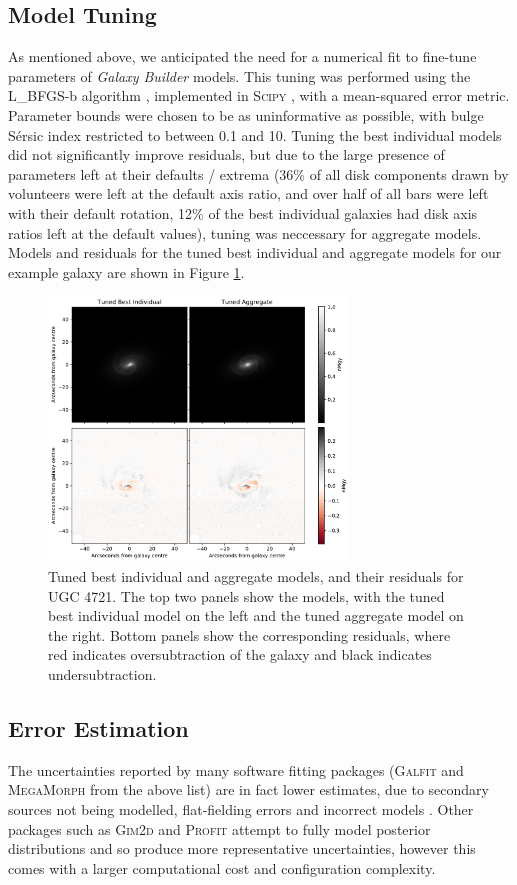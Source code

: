 \documentclass[../main.tex]{subfiles}
\begin{document}
\subsection{Model Tuning}

As mentioned above, we anticipated the need for a numerical fit to fine-tune parameters of \textit{Galaxy Builder} models. This tuning was performed using the L\_BFGS-b algorithm \citep{doi:10.1137/0916069}, implemented in \textsc{Scipy} \citep{scipy-paper}, with a mean-squared error metric. Parameter bounds were chosen to be as uninformative as possible, with bulge Sérsic index restricted to between 0.1 and 10. Tuning the best individual models did not significantly improve residuals, but due to the large presence of parameters left at their defaults / extrema (36\% of all disk components drawn by volunteers were left at the default axis ratio, and over half of all bars were left with their default rotation, 12\% of the best individual galaxies had disk axis ratios left at the default values), tuning was neccessary for aggregate models. Models and residuals for the tuned best individual and aggregate models for our example galaxy are shown in Figure \ref{fig:bi_vs_agg_comparison}.

\begin{figure}
  \includegraphics[width=8cm]{images__method/bi_vs_agg_comparison.pdf}
  \caption{Tuned best individual and aggregate models, and their residuals for UGC 4721. The top two panels show the models, with the tuned best individual model on the left and the tuned aggregate model on the right. Bottom panels show the corresponding residuals, where red indicates oversubtraction of the galaxy and black indicates undersubtraction.}
  \label{fig:bi_vs_agg_comparison}
\end{figure}

\subsection{Error Estimation}
\label{sec:error_estimation}
The uncertainties reported by many software fitting packages (\textsc{Galfit} and \textsc{MegaMorph} from the above list) are in fact lower estimates, due to secondary sources not being modelled, flat-fielding errors and incorrect models \citep{2010AJ....139.2097P}. Other packages such as \textsc{Gim2d} and \textsc{Profit} attempt to fully model posterior distributions and so produce more representative uncertainties, however this comes with a larger computational cost and configuration complexity.
\end{document}
